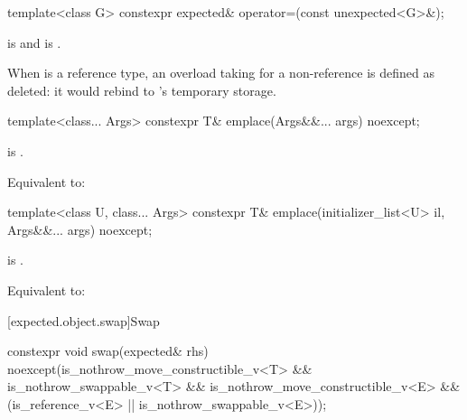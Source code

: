 %
\begin{itemdecl}
template<class G> constexpr expected& operator=(const unexpected<G>&);
\end{itemdecl}

\begin{itemdescr}
\pnum
\constraints
{} is  and  is .

\pnum
\remarks
When  is a reference type, an overload taking  for a non-reference  is defined as deleted: it would rebind  to 's temporary storage.
\end{itemdescr}

%
\begin{itemdecl}
template<class... Args> constexpr T& emplace(Args&&... args) noexcept;
\end{itemdecl}

\begin{itemdescr}
\pnum
\constraints
{} is .

\pnum
\effects
Equivalent to: 
\end{itemdescr}

%
\begin{itemdecl}
template<class U, class... Args>
constexpr T& emplace(initializer_list<U> il, Args&&... args) noexcept;
\end{itemdecl}

\begin{itemdescr}
\pnum
\constraints
{} is .

\pnum
\effects
Equivalent to: 
\end{itemdescr}

[expected.object.swap]{Swap}

%
\begin{itemdecl}
constexpr void swap(expected& rhs) noexcept(is_nothrow_move_constructible_v<T> &&
                                            is_nothrow_swappable_v<T> &&
                                            is_nothrow_move_constructible_v<E> &&
                                            (is_reference_v<E> ||
                                             is_nothrow_swappable_v<E>));
\end{itemdecl}

